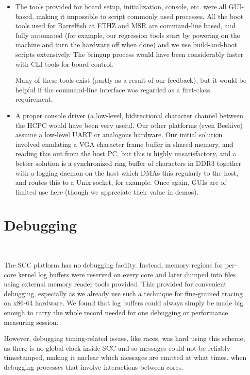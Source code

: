 \documentclass[a4paper,twoside]{report} %
\begin{document}
\begin{itemize}
\item The tools provided for board setup, initialization, console,
  etc. were all GUI-based, making it impossible to script commonly
  used processes.  All the boot tools used for Barrelfish at ETHZ and
  MSR are command-line based, and fully automated (for example, our
  regression tools start by powering on the machine and turn the
  hardware off when done) and we use build-and-boot scripts
  extensively.  The bringup process would have been considerably
  faster with CLI tools for board control.

  Many of these tools exist (partly as a result of our feedback), but
  it would be helpful if the command-line interface was regarded as a
  first-class requirement. 

\item A proper console driver (a low-level, bidirectional character
  channel between the HCPC would have been very useful.  Our other
  platforms (even Beehive) assume a low-level UART or analogous
  hardware.  Our initial solution involved emulating a VGA character
  frame buffer in shared memory, and reading this out from the host
  PC, but this is highly unsatisfactory, and a better solution is a
  synchronized ring buffer of characters in DDR3 together with a
  logging daemon on the host which DMAs this regularly to the host,
  and routes this to a Unix socket, for example.  Once again, GUIs are
  of limited use here (though we appreciate their value in demos).

\end{itemize}

\section{Debugging}~\label{debugging}

The SCC platform has no debugging facility. Instead, memory regions
for per-core kernel log buffers were reserved on every core and later
dumped into files using external memory reader tools provided.  This
provided for convenient debugging, especially as we already use such a
technique for fine-grained tracing on x86-64 hardware.  We found that
log buffers could always simply be made big enough to carry the whole
record needed for one debugging or performance measuring session.

However, debugging timing-related issues, like races, was hard
using this scheme, as there is no global clock inside SCC and so
messages could not be reliably timestamped, making it unclear which
messages are emitted at what times, when debugging processes that
involve interactions between cores.  
\end{document}
